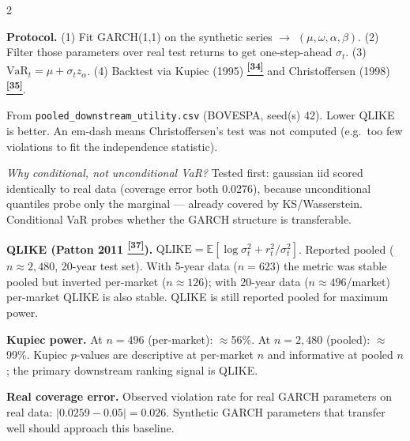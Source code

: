 \documentclass[10pt]{article}
\newcommand{\tcite}[1]{%
  \hyperlink{R:#1}{\textsuperscript{\scriptsize\textbf{[#1]}}}}
\newcommand{\E}{\mathbb{E}}
\begin{document}
\begin{multicols}{2}
{\textbf{Protocol.} (1) Fit GARCH(1,1) on the synthetic series $\to$ $(\mu, \omega, \alpha, \beta)$. (2) Filter those parameters over real test returns to get one-step-ahead $\sigma_t$. (3) $\text{VaR}_t = \mu + \sigma_t z_\alpha$. (4) Backtest via Kupiec (1995)\tcite{34} and Christoffersen (1998)\tcite{35}.

\smallskip
{}

\smallskip
{\small From \texttt{pooled\_downstream\_utility.csv} (BOVESPA, seed(s) 42). Lower QLIKE is better. An em-dash means Christoffersen's test was not computed (e.g.\ too few violations to fit the independence statistic).}

\textit{Why conditional, not unconditional VaR?} Tested first: gaussian iid scored identically to real data (coverage error both 0.0276), because unconditional quantiles probe only the marginal --- already covered by KS/Wasserstein. Conditional VaR probes whether the GARCH structure is transferable.

\textbf{QLIKE (Patton 2011\tcite{37}).} $\text{QLIKE} = \E[\log\sigma_t^2 + r_t^2/\sigma_t^2]$. Reported pooled ($n\approx2{,}480$, 20-year test set). With 5-year data ($n=623$) the metric was stable pooled but inverted per-market ($n\approx126$); with 20-year data ($n\approx496$/market) per-market QLIKE is also stable. QLIKE is still reported pooled for maximum power.

\textbf{Kupiec power.} At $n=496$ (per-market): $\approx$56\%. At $n=2{,}480$ (pooled): $\approx$99\%. Kupiec $p$-values are descriptive at per-market $n$ and informative at pooled $n$; the primary downstream ranking signal is QLIKE.

\textbf{Real coverage error.} Observed violation rate for real GARCH parameters on real data: $|0.0259 - 0.05| = 0.026$. Synthetic GARCH parameters that transfer well should approach this baseline.}


\end{multicols}
\end{document}
